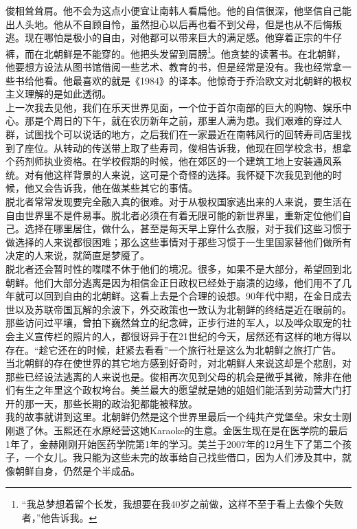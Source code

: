 俊相耸耸肩。他不会为这点小便宜让南韩人看扁他。他的自信很深，他坚信自己能出人头地。他从不自顾自怜，虽然担心以后再也看不到父母，但是也从不后悔叛逃。现在哪怕是极小的自由，对他都可以带来巨大的满足感。他穿着正宗的牛仔裤，而在北朝鲜是不能穿的。他把头发留到肩膀\footnote{“我总梦想着留个长发，我想要在我40岁之前做，这样不至于看上去像个失败者，”他告诉我。}。他贪婪的读著书。在北朝鲜，他要想方设法从图书馆借阅一些艺术、教育的书，但是经常是没有。我也经常拿一些书给他看。他最喜欢的就是《1984》的译本。他惊奇于乔治欧文对北朝鲜的极权主义理解的是如此透彻。\\

上一次我去见他，我们在乐天世界见面，一个位于首尔南部的巨大的购物、娱乐中心。那是个周日的下午，就在农历新年之前，那里人满为患。我们艰难的穿过人群，试图找个可以说话的地方，之后我们在一家最近在南韩风行的回转寿司店里找到了座位。从转动的传送带上取了些寿司，俊相告诉我，他现在回学校念书，想拿个药剂师执业资格。在学校假期的时候，他在郊区的一个建筑工地上安装通风系统。对有他这样背景的人来说，这可是个奇怪的选择。我怀疑下次我见到他的时候，他又会告诉我，他在做某些其它的事情。\\

脱北者常常发现要完全融入真的很难。对于从极权国家逃出来的人来说，要生活在自由世界里不是件易事。脱北者必须在有着无限可能的新世界里，重新定位他们自己。选择在哪里居住，做什么，甚至是每天早上穿什么衣服，对于我们这些习惯于做选择的人来说都很困难；那么这些事情对于那些习惯于一生里国家替他们做所有决定的人来说，就简直是梦魇了。\\

脱北者还会暂时性的喋喋不休于他们的境况。很多，如果不是大部分，希望回到北朝鲜。他们大部分逃离是因为相信金正日政权已经处于崩溃的边缘，他们用不了几年就可以回到自由的北朝鲜。这看上去是个合理的设想。90年代中期，在金日成去世以及苏联帝国瓦解的余波下，外交政策也一致认为北朝鲜的终结是近在眼前的。那些访问过平壤，曾拍下巍然耸立的纪念碑，正步行进的军人，以及哗众取宠的社会主义宣传栏的照片的人，都很讶异于在21世纪的今天，居然还有这样的地方得以存在。“趁它还在的时候，赶紧去看看”一个旅行社是这么为北朝鲜之旅打广告。\\

当北朝鲜的存在使世界的其它地方感到好奇时，对北朝鲜人来说这却是个悲剧，对那些已经设法逃离的人来说也是。俊相再次见到父母的机会是微乎其微，除非在他们有生之年里这个政权垮台。美兰最大的愿望就是她的姐姐们能活到劳动营大门打开的那一天，那些长期的政治犯都能被释放。\\

我的故事就讲到这里。北朝鲜仍然是这个世界里最后一个纯共产党堡垒。宋女士刚刚退了休。玉熙还在水原经营这她Karaoke的生意。金医生现在是在医学院的最后1年了，金赫刚刚开始医药学院第1年的学习。美兰于2007年的12月生下了第二个孩子，一个女儿。我只能为这些未完的故事给自己找些借口，因为人们涉及其中，就像朝鲜自身，仍然是个半成品。\\
